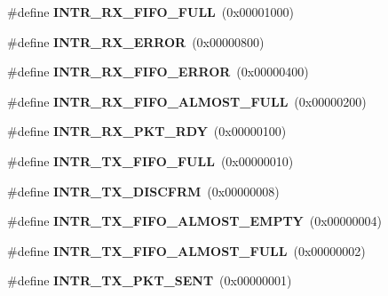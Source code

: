 \begin{DoxyCompactItemize}
\#define {\bfseries I\+N\+T\+R\+\_\+\+R\+X\+\_\+\+F\+I\+F\+O\+\_\+\+F\+U\+LL}~(0x00001000)
\item 
\mbox{\label{group__lm32__tsmac_ga024f7dc6d667517030f23aebe96573a9}} 
\#define {\bfseries I\+N\+T\+R\+\_\+\+R\+X\+\_\+\+E\+R\+R\+OR}~(0x00000800)
\item 
\mbox{\label{group__lm32__tsmac_ga8a6b3ea738de573f252b53d7ff3219f9}} 
\#define {\bfseries I\+N\+T\+R\+\_\+\+R\+X\+\_\+\+F\+I\+F\+O\+\_\+\+E\+R\+R\+OR}~(0x00000400)
\item 
\mbox{\label{group__lm32__tsmac_ga53389bdbee828c39be0c8cbe27729f32}} 
\#define {\bfseries I\+N\+T\+R\+\_\+\+R\+X\+\_\+\+F\+I\+F\+O\+\_\+\+A\+L\+M\+O\+S\+T\+\_\+\+F\+U\+LL}~(0x00000200)
\item 
\mbox{\label{group__lm32__tsmac_gaa2994a0e6c256aa19f2aa173cabec78e}} 
\#define {\bfseries I\+N\+T\+R\+\_\+\+R\+X\+\_\+\+P\+K\+T\+\_\+\+R\+DY}~(0x00000100)
\item 
\mbox{\label{group__lm32__tsmac_ga47bd2d41b3f497b4972e275df811aaa5}} 
\#define {\bfseries I\+N\+T\+R\+\_\+\+T\+X\+\_\+\+F\+I\+F\+O\+\_\+\+F\+U\+LL}~(0x00000010)
\item 
\mbox{\label{group__lm32__tsmac_ga10bd4e83ed924d239199c77a670a348b}} 
\#define {\bfseries I\+N\+T\+R\+\_\+\+T\+X\+\_\+\+D\+I\+S\+C\+F\+RM}~(0x00000008)
\item 
\mbox{\label{group__lm32__tsmac_ga3463d6a85fc01a2de786dbb9faba6088}} 
\#define {\bfseries I\+N\+T\+R\+\_\+\+T\+X\+\_\+\+F\+I\+F\+O\+\_\+\+A\+L\+M\+O\+S\+T\+\_\+\+E\+M\+P\+TY}~(0x00000004)
\item 
\mbox{\label{group__lm32__tsmac_gab17a0c58a0eb6cfbde5d06101bfd3bb3}} 
\#define {\bfseries I\+N\+T\+R\+\_\+\+T\+X\+\_\+\+F\+I\+F\+O\+\_\+\+A\+L\+M\+O\+S\+T\+\_\+\+F\+U\+LL}~(0x00000002)
\item 
\mbox{\label{group__lm32__tsmac_gab0b47e0418cc1c4b51800705d5c81b78}} 
\#define {\bfseries I\+N\+T\+R\+\_\+\+T\+X\+\_\+\+P\+K\+T\+\_\+\+S\+E\+NT}~(0x00000001)

\end{DoxyCompactItemize}
